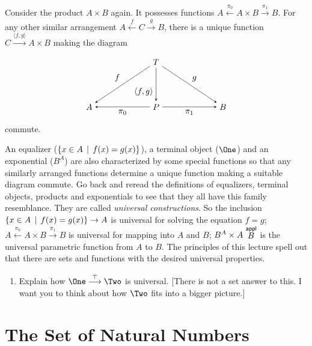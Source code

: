 Consider the product $A\times B$ again.
It possesses functions 
$A\stackrel{\pi_0}{\longleftarrow}A\times B\stackrel{\pi_1}{\longrightarrow}B$. For any other similar arrangement
$A\stackrel{f}{\longleftarrow}C\stackrel{g}{\longrightarrow}B$, there is a unique function $C\stackrel{\langle f,g\rangle}{\longrightarrow}{A\times B}$ making the diagram
\[
\tikzset{>=stealth}
\begin{tikzpicture}[every node/.style={midway}]
\matrix[column sep={4em,between origins},row sep={2em}] at (0,0)
{ 					&	& \node(T) {$T$}; &	& \\
	\\
	\node(A)   {$A$}; &	& \node(P) {$P$}; &	& \node(B) {$B$}; \\};
\draw[->] (T) -- (A) node[anchor=south east]  {$f$};
\draw[->] (T) -- (B) node[anchor=south west]  {$g$};
\draw[->] (T) -- (P) node[anchor=north east] {$\langle f,g \rangle$};
\draw[->] (P) -- (A) node[anchor=north] {$\pi_0$};
\draw[->] (P) -- (B) node[anchor=north] {$\pi_1$};
\end{tikzpicture}
\]
commute.

An equalizer ($\{x\in A\,\mid\, f(x)=g(x)\}$), a terminal object ($\One$) and an exponential ($B^A$) are also characterized by some special functions so that any similarly arranged functions determine a unique function making a suitable diagram commute. Go back and reread the definitions of equalizers, terminal objects, products and exponentials to see that they all have this family resemblance. They are called \emph{universal constructions}. So the inclusion $\{x\in A\,\mid\, f(x)=g(x)\}\to A$ is universal for solving the equation $f=g$; $A\stackrel{\pi_0}{\longleftarrow}A\times B\stackrel{\pi_1}{\longrightarrow}B$ is universal for mapping into $A$ and $B$;
$B^A\times A\stackrel{\mathord{\textsf{appl}}}B$ is the universal parametric function from $A$ to $B$. The principles of this lecture spell out that there are sets and functions 
with the desired universal properties.

\begin{exercises}
	\begin{enumerate}
		\item Explain how $\One\stackrel{\hat{\top}}{\longrightarrow}\Two$ is universal. [There is not a set answer to this. I want you to think about how $\Two$ fits into a bigger picture.]
	\end{enumerate}
\end{exercises}

\chapter{The Set of Natural Numbers}\label{lec:natural-numbers}

